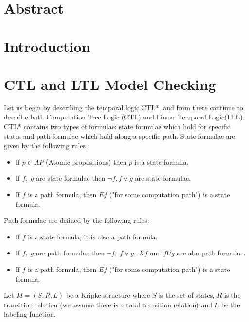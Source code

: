 \documentclass[11pt]{article}
\begin{document}
\section{Abstract}

\section{Introduction}

\section{CTL and LTL Model Checking}
    Let us begin by describing the temporal logic CTL*, and from there continue
    to describe both Computation Tree Logic (CTL) and Linear Temporal Logic(LTL).
    CTL* contains two types of formulae: state formulae which hold for specific
    states and path formulae which hold along a specific path. State formulae
    are given by the following rules \cite{ltl}:
    \begin{itemize}
        \item
            If $p \in AP$ (Atomic propositions) then $p$ is a state formula.

        \item
            If $f,\; g$ are state formulae then $\neg f, f \vee g$ are state formulae.

        \item
            If $f$ is a path formula, then $Ef$ ("for some computation path")
            is a state formula.
    \end{itemize}

    Path formulae are defined by the following rules:
    \begin{itemize}
        \item
            If $f$ is a state formula, it is also a path formula.

        \item
            If $f,\; g$ are path formulae then $\neg f,\; f \vee g, \; Xf$ and 
            $fUg$ are also path formulae.

        \item
            If $f$ is a path formula, then $Ef$ ("for some computation path")
            is a state formula.
    \end{itemize}
 
    Let $M = (S,R,L)$ be a Kripke structure where $S$ is the set of states, $R$
    is the transition relation (we assume there is a total transition relation)
    and $L$ be the labeling function.
\end{document}
